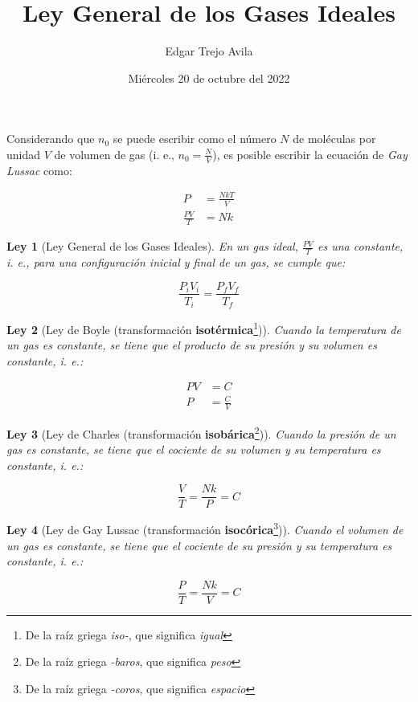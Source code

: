 \documentclass{article}
\title{Ley General de los Gases Ideales}
\author{Edgar Trejo Avila}
\date{Miércoles 20 de octubre del 2022}
\newtheorem{law}{Ley}
\begin{document}
\maketitle

Considerando que \(n_0\) se puede
escribir como el número \(N\) de moléculas
por unidad \(V\) de volumen de gas (i. e., \(n_0 = \frac{N}{V}\)),
es posible escribir la ecuación de \emph{Gay Lussac}
como:

\begin{align*}
    P &= \frac{NkT}{V} \\
    \frac{PV}{T} &= Nk
\end{align*}

\begin{law}[Ley General de los Gases Ideales]
    En un gas ideal, \(\frac{PV}{T}\) es una constante,
    i. e., para una configuración inicial y final de un gas,
    se cumple que:

    \[
        \frac{P_iV_i}{T_i} = \frac{P_fV_f}{T_f}
    \]
\end{law}

\begin{law}[Ley de Boyle (transformación \textbf{isotérmica}\footnote{De la raíz griega \textit{iso-}, que significa \textit{igual}})]
    Cuando la temperatura de un gas es constante,
    se tiene que el producto de su presión y su volumen
    es constante, i. e.:

    \begin{align*}
        PV &= C\\
        P &= \frac{C}{V}
    \end{align*}
\end{law}

\begin{law}[Ley de Charles (transformación \textbf{isobárica}\footnote{De la raíz griega \textit{-baros}, que significa \textit{peso}})]
    Cuando la presión de un gas es constante,
    se tiene que el cociente de su volumen y
    su temperatura es constante, i. e.:

    \[
        \frac{V}{T} = \frac{Nk}{P} = C
    \]
\end{law}

\begin{law}[Ley de Gay Lussac (transformación \textbf{isocórica}\footnote{De la raíz griega \textit{-coros}, que significa \textit{espacio}})]
    Cuando el volumen de un gas es constante, 
    se tiene que el cociente de su presión y 
    su temperatura es constante, i. e.:

    \[
        \frac{P}{T} = \frac{Nk}{V} = C
    \]
\end{law}

\thispagestyle{empty}
\end{document}
